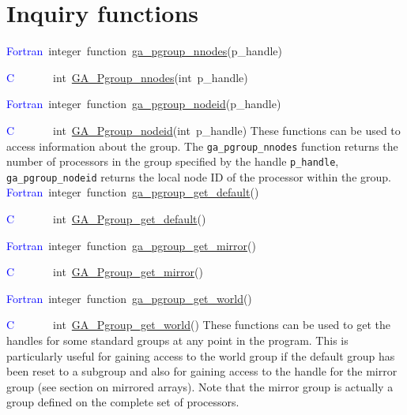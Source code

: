 \section{Inquiry functions}
\textcolor{blue}{Fortran}~integer~function~\href{http://www.emsl.pnl.gov/docs/global/ga_ops.html\#GA_PGROUP_NNODES}{ga\_{}pgroup\_{}nnodes}(p\_handle)

\textcolor{blue}{C}~~~~~~~int~\href{http://www.emsl.pnl.gov/docs/global/c_nga_ops.html\#GA_PGROUP_NNODES}{GA\_{}Pgroup\_{}nnodes}(int~p\_handle)

\textcolor{blue}{Fortran}~integer~function~\href{http://www.emsl.pnl.gov/docs/global/ga_ops.html\#GA_PGROUP_NODEID}{ga\_{}pgroup\_{}nodeid}(p\_handle)

\textcolor{blue}{C}~~~~~~~int~\href{http://www.emsl.pnl.gov/docs/global/c_nga_ops.html\#GA_PGROUP_NODEID}{GA\_{}Pgroup\_{}nodeid}(int~p\_handle)
These functions can be used to access information about the group.
The \texttt{ga\_pgroup\_nnodes} function returns the number of processors
in the group specified by the handle \texttt{p\_handle}, \texttt{ga\_pgroup\_nodeid}
returns the local node ID of the processor within the group.
\textcolor{blue}{Fortran}~integer~function~\href{http://www.emsl.pnl.gov/docs/global/ga_ops.html\#GA_PGROUP_GET_DEFAULT}{ga\_{}pgroup\_{}get\_{}default}()

\textcolor{blue}{C}~~~~~~~int~\href{http://www.emsl.pnl.gov/docs/global/c_nga_ops.html\#GA_PGROUP_GET_DEFAULT}{GA\_{}Pgroup\_{}get\_{}default}()

\textcolor{blue}{Fortran}~integer~function~\href{http://www.emsl.pnl.gov/docs/global/ga_ops.html\#GA_PGROUP_GET_MIRROR}{ga\_{}pgroup\_{}get\_{}mirror}()

\textcolor{blue}{C}~~~~~~~int~\href{http://www.emsl.pnl.gov/docs/global/c_nga_ops.html\#GA_PGROUP_GET_MIRROR}{GA\_{}Pgroup\_{}get\_{}mirror}()

\textcolor{blue}{Fortran}~integer~function~\href{http://www.emsl.pnl.gov/docs/global/ga_ops.html\#GA_PGROUP_GET_WORLD}{ga\_{}pgroup\_{}get\_{}world}()

\textcolor{blue}{C}~~~~~~~int~\href{http://www.emsl.pnl.gov/docs/global/c_nga_ops.html\#GA_PGROUP_GET_WORLD}{GA\_{}Pgroup\_{}get\_{}world}()
These functions can be used to get the handles for some standard groups
at any point in the program. This is particularly useful for gaining
access to the world group if the default group has been reset to a
subgroup and also for gaining access to the handle for the mirror
group (see section on mirrored arrays). Note that the mirror group
is actually a group defined on the complete set of processors. 



